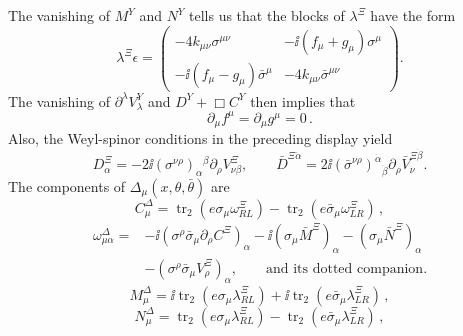 The vanishing of \(M^Y\) and \(N^Y\) tells us that the blocks of
\(\lambda^\Xi\) have the form
\begin{equation}
  \lambda^\Xi\epsilon
  =
  \begin{pmatrix}
    -4k_{\mu\nu}\sigma^{\mu\nu}
      &-\ii(f_\mu+g_\mu)\sigma^\mu\\
    -\ii(f_\mu-g_\mu)\bar\sigma^\mu
      &-4k_{\mu\nu}\bar\sigma^{\mu\nu}
  \end{pmatrix}.
  \tag{31.1.35}\label{eq:31.1.35}
\end{equation}
The vanishing of \(\partial^\lambda V_\lambda^Y\) and
\(D^Y+\Box C^Y\) then implies that
\begin{equation}
  \partial_\mu f^\mu=\partial_\mu g^\mu=0\,.
  \tag{31.1.36}\label{eq:31.1.36}
\end{equation}
Also, the Weyl-spinor conditions in the preceding display yield
\begin{equation}
  D^\Xi_\alpha
  =-2\ii(\sigma^{\nu\rho})_\alpha{}^\beta
    \partial_\rho V_{\nu\beta}^\Xi,
  \qquad
  \bar D^{\Xi\dot\alpha}
  =2\ii(\bar\sigma^{\nu\rho})^{\dot\alpha}{}_{\dot\beta}
    \partial_\rho\bar V_\nu^{\Xi\dot\beta}.
  \tag{31.1.37}\label{eq:31.1.37}
\end{equation}
The components of \(\Delta_\mu(x,\theta,\bar\theta)\) are
\begin{equation}
  C_\mu^\Delta
  =\operatorname{tr}_2(e\sigma_\mu\omega^\Xi_{RL})
   -\operatorname{tr}_2(e\bar\sigma_\mu\omega^\Xi_{LR})\,,
  \tag{31.1.38}\label{eq:31.1.38}
\end{equation}
\begin{equation}
  \begin{aligned}
  \omega_{\mu\alpha}^\Delta
  ={}&-\ii(\sigma^\rho\bar\sigma_\mu
      \partial_\rho C^\Xi)_\alpha
     -\ii(\sigma_\mu\bar M^\Xi)_\alpha
     -(\sigma_\mu\bar N^\Xi)_\alpha\\
    &-(\sigma^\rho\bar\sigma_\mu V_\rho^\Xi)_\alpha,
  \qquad\text{and its dotted companion}.
  \end{aligned}
  \tag{31.1.39}\label{eq:31.1.39}
\end{equation}
\begin{equation}
  M_\mu^\Delta
  =\ii\operatorname{tr}_2(e\sigma_\mu\lambda^\Xi_{RL})
   +\ii\operatorname{tr}_2(e\bar\sigma_\mu\lambda^\Xi_{LR})\,,
  \tag{31.1.40}\label{eq:31.1.40}
\end{equation}
\begin{equation}
  N_\mu^\Delta
  =\operatorname{tr}_2(e\sigma_\mu\lambda^\Xi_{RL})
   -\operatorname{tr}_2(e\bar\sigma_\mu\lambda^\Xi_{LR})\,,
  \tag{31.1.41}\label{eq:31.1.41}
\end{equation}
